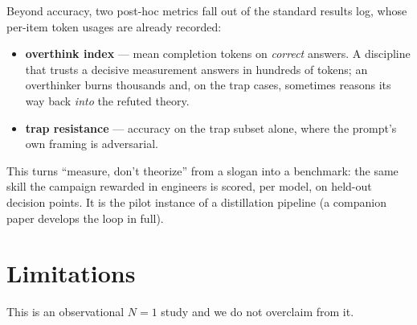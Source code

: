 \documentclass[11pt]{article}
\begin{document}
Beyond accuracy, two post-hoc metrics fall out of the standard results log, whose per-item token usages are
already recorded:
\begin{itemize}[leftmargin=1.4em,itemsep=1pt,topsep=2pt]
\item \textbf{overthink index} --- mean completion tokens on \emph{correct} answers. A discipline that
trusts a decisive measurement answers in hundreds of tokens; an overthinker burns thousands and, on the
trap cases, sometimes reasons its way back \emph{into} the refuted theory.
\item \textbf{trap resistance} --- accuracy on the trap subset alone, where the prompt's own framing is
adversarial.
\end{itemize}

This turns ``measure, don't theorize'' from a slogan into a benchmark: the same skill the campaign
rewarded in engineers is scored, per model, on held-out decision points. It is the pilot instance of a
distillation pipeline (a companion paper develops the loop in full).

\section{Limitations}
\label{sec:limits}

This is an observational $N{=}1$ study and we do not overclaim from it.
\end{document}
